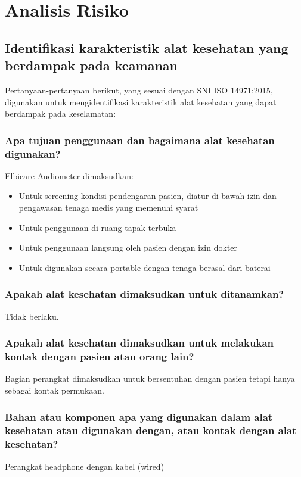 \documentclass[11pt,a4paper,twoside,onecolumn]{book}
\begin{document}
	\newpage
	
	\chapter{Analisis Risiko}
		\section{Identifikasi karakteristik alat kesehatan yang berdampak pada keamanan}
		Pertanyaan-pertanyaan berikut, yang sesuai dengan SNI ISO 14971:2015, digunakan untuk mengidentifikasi karakteristik alat kesehatan yang dapat berdampak pada keselamatan:
			\subsection{Apa tujuan penggunaan dan bagaimana alat kesehatan digunakan?}
			Elbicare Audiometer dimaksudkan:
			\begin{itemize}
				\item Untuk screening kondisi pendengaran pasien, diatur di bawah izin dan pengawasan tenaga medis yang memenuhi syarat
				\item Untuk penggunaan di ruang tapak terbuka
				\item Untuk penggunaan langsung oleh pasien dengan izin dokter
				\item Untuk digunakan secara portable dengan tenaga berasal dari baterai 
			\end{itemize}
			
			\subsection{Apakah alat kesehatan dimaksudkan untuk ditanamkan?}
			Tidak berlaku.
			
			\subsection{Apakah alat kesehatan dimaksudkan untuk melakukan kontak dengan pasien atau orang lain?}
			Bagian perangkat dimaksudkan untuk bersentuhan dengan pasien tetapi hanya sebagai kontak permukaan.
			
			\subsection{Bahan atau komponen apa yang digunakan dalam alat kesehatan atau digunakan dengan, atau kontak dengan alat kesehatan?}
			Perangkat headphone dengan kabel (wired)
			
\end{document}
